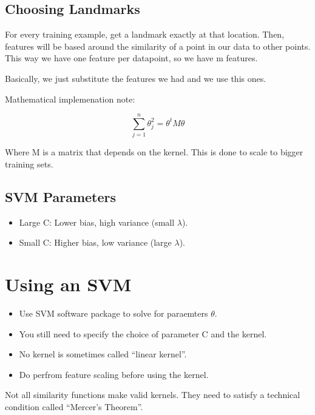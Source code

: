 \documentclass[10pt]{extarticle}
\begin{document}
\subsection{Choosing Landmarks}\label{choosing-landmarks}

For every training example, get a landmark exactly at that location.
Then, features will be based around the similarity of a point in our
data to other points. This way we have one feature per datapoint, so we
have m features. \smallskip

Basically, we just substitute the features we had and we use this ones.

Mathematical implemenation note:

\begin{equation} 
\sum_{j=1}^n \theta_j^2 = \theta^t M \theta
\end{equation}

Where M is a matrix that depends on the kernel. This is done to scale to
bigger training sets.

\subsection{SVM Parameters}\label{svm-parameters}

\begin{itemize}
\itemsep1pt\parskip0pt
\item
  Large C: Lower bias, high variance (small $\lambda$).
\item
  Small C: Higher bias, low variance (large $\lambda$).
\end{itemize}

\section{Using an SVM}\label{using-an-svm}

\begin{itemize}
\itemsep1pt\parskip0pt
\item
  Use SVM software package to solve for paraemters $\theta$.
\item
  You still need to specify the choice of parameter C and the kernel.
\item
  No kernel is sometimes called ``linear kernel''.
\item
  Do perfrom feature scaling before using the kernel.
\end{itemize}

Not all similarity functions make valid kernels. They need to satisfy a
technical condition called ``Mercer's Theorem''.
\end{document}
